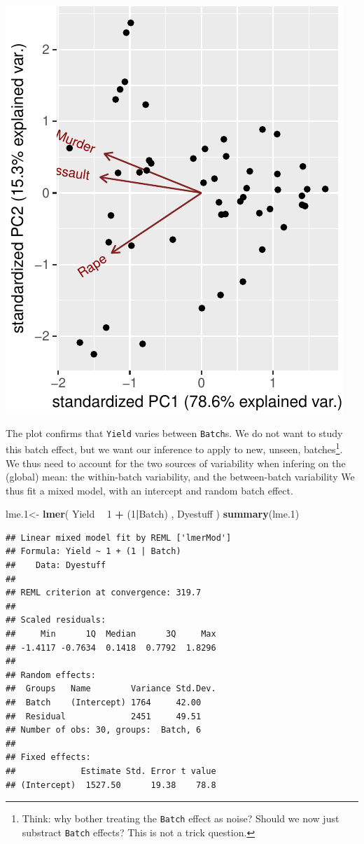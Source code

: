 \documentclass[]{book}
\newenvironment{Shaded}{\begin{snugshade}}{\end{snugshade}}
\newcommand{\DecValTok}[1]{\textcolor[rgb]{0.00,0.00,0.81}{#1}}
\newcommand{\FloatTok}[1]{\textcolor[rgb]{0.00,0.00,0.81}{#1}}
\newcommand{\KeywordTok}[1]{\textcolor[rgb]{0.13,0.29,0.53}{\textbf{#1}}}
\newcommand{\NormalTok}[1]{#1}
\newcommand{\OperatorTok}[1]{\textcolor[rgb]{0.81,0.36,0.00}{\textbf{#1}}}
\newcommand{\StringTok}[1]{\textcolor[rgb]{0.31,0.60,0.02}{#1}}
\theoremstyle{definition}
\theoremstyle{definition}
\theoremstyle{definition}
\theoremstyle{remark}
\begin{document}
\includegraphics[width=0.5\linewidth]{Rcourse_files/figure-latex/unnamed-chunk-199-1}

The plot confirms that \texttt{Yield} varies between \texttt{Batch}s.
We do not want to study this batch effect, but we want our inference to apply to new, unseen, batches\footnote{Think: why bother treating the \texttt{Batch} effect as noise? Should we now just substract \texttt{Batch} effects? This is not a trick question.}.
We thus need to account for the two sources of variability when infering on the (global) mean: the within-batch variability, and the between-batch variability
We thus fit a mixed model, with an intercept and random batch effect.

\begin{Shaded}
\begin{Highlighting}[]
\NormalTok{lme}\FloatTok{.1}\NormalTok{<-}\StringTok{ }\KeywordTok{lmer}\NormalTok{( Yield }\OperatorTok{~}\StringTok{ }\DecValTok{1} \OperatorTok{+}\StringTok{ }\NormalTok{(}\DecValTok{1}\OperatorTok{|}\NormalTok{Batch)  , Dyestuff )}
\KeywordTok{summary}\NormalTok{(lme}\FloatTok{.1}\NormalTok{)}
\end{Highlighting}
\end{Shaded}

\begin{verbatim}
## Linear mixed model fit by REML ['lmerMod']
## Formula: Yield ~ 1 + (1 | Batch)
##    Data: Dyestuff
## 
## REML criterion at convergence: 319.7
## 
## Scaled residuals: 
##     Min      1Q  Median      3Q     Max 
## -1.4117 -0.7634  0.1418  0.7792  1.8296 
## 
## Random effects:
##  Groups   Name        Variance Std.Dev.
##  Batch    (Intercept) 1764     42.00   
##  Residual             2451     49.51   
## Number of obs: 30, groups:  Batch, 6
## 
## Fixed effects:
##             Estimate Std. Error t value
## (Intercept)  1527.50      19.38    78.8
\end{verbatim}
\end{document}
